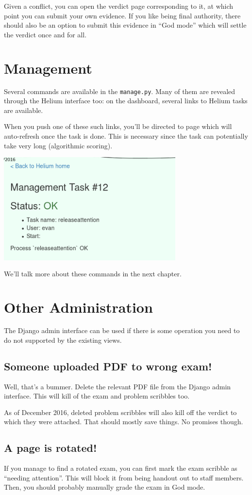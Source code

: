 Given a conflict, you can open the verdict page corresponding to it,
at which point you can submit your own evidence.
If you like being final authority,
there should also be an option to submit this evidence in ``God mode''
which will settle the verdict once and for all.
\section{Management}
Several commands are available in the \texttt{manage.py}.
Many of them are revealed through the Helium interface too:
on the dashboard, several links to Helium tasks are available.

When you push one of these such links, you'll be directed to page
which will auto-refresh once the task is done.
This is necessary since the task can potentially take very long
(algorithmic scoring).
\begin{center}
	\includegraphics[width=0.7\textwidth]{images/viewtask.png}
\end{center}

We'll talk more about these commands in the next chapter.

\section{Other Administration}
The Django admin interface can be used if there
is some operation you need to do not supported by the existing views.
\subsection{Someone uploaded PDF to wrong exam!}
Well, that's a bummer. 
Delete the relevant PDF file from the Django admin interface.
This will kill of the exam and problem scribbles too.

As of December 2016, deleted problem scribbles will also kill
off the verdict to which they were attached.
That should mostly save things. No promises though.

\subsection{A page is rotated!}
If you manage to find a rotated exam,
you can first mark the exam scribble as ``needing attention''.
This will block it from being handout out to staff members.
Then, you should probably manually grade the exam in God mode.

